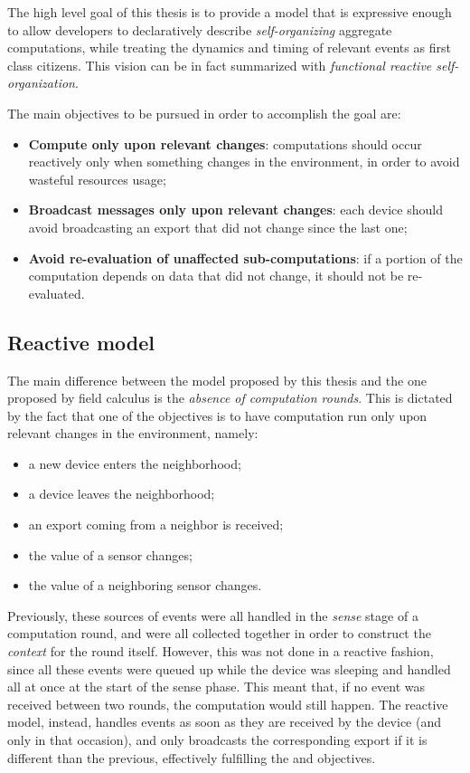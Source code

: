 The high level goal of this thesis is to provide a model that is expressive enough to allow developers to declaratively describe \textit{self-organizing} aggregate computations, while treating the dynamics and timing of relevant events as first class citizens.
%
This vision can be in fact summarized with \textit{functional reactive self-organization}.

The main objectives to be pursued in order to accomplish the goal are:
%
\begin{itemize}
    \item \textbf{Compute only upon relevant changes}: computations should occur reactively only when something changes in the environment, in order to avoid wasteful resources usage;
    \item \textbf{Broadcast messages only upon relevant changes}: each device should avoid broadcasting an export that did not change since the last one;
    \item \textbf{Avoid re-evaluation of unaffected sub-computations}: if a portion of the computation depends on data that did not change, it should not be re-evaluated.
\end{itemize}

\subsection{Reactive model}

The main difference between the model proposed by this thesis and the one proposed by field calculus is the \textit{absence of computation rounds}.
%
This is dictated by the fact that one of the objectives is to have computation run only upon relevant changes in the environment, namely:
%
\begin{itemize}
    \item a new device enters the neighborhood;
    \item a device leaves the neighborhood;
    \item an export coming from a neighbor is received;
    \item the value of a sensor changes;
    \item the value of a neighboring sensor changes.
\end{itemize}
%
Previously, these sources of events were all handled in the \textit{sense} stage of a computation round, and were all collected together in order to construct the \textit{context} for the round itself.
%
However, this was not done in a reactive fashion, since all these events were queued up while the device was sleeping and handled all at once at the start of the sense phase.
%
This meant that, if no event was received between two rounds, the computation would still happen.
%
The reactive model, instead, handles events as soon as they are received by the device (and only in that occasion), and only broadcasts the corresponding export if it is different than the previous, effectively fulfilling the  and  objectives.


